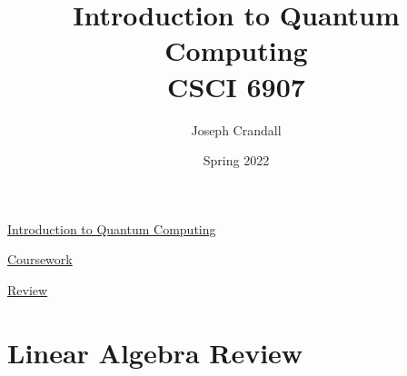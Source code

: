 
\usepackage{algorithm, algpseudocode, color, gensymb, siunitx, soul, subfiles}
\usepackage[a4paper, total={7.5in, 10in}]{geometry}

\title{Introduction to Quantum Computing\\
\large CSCI 6907}
\author{Joseph Crandall}
\date{Spring 2022}


\maketitle

\href{https://www2.seas.gwu.edu/~simhaweb/quantum/index.html}{Introduction to Quantum Computing}

\href{https://www2.seas.gwu.edu/~simhaweb/quantum/coursework.html}{Coursework}


\href{https://www2.seas.gwu.edu/~simhaweb/quantum/modules/review/review.html}{Review}

\section{Linear Algebra Review}


%

%

%

%


